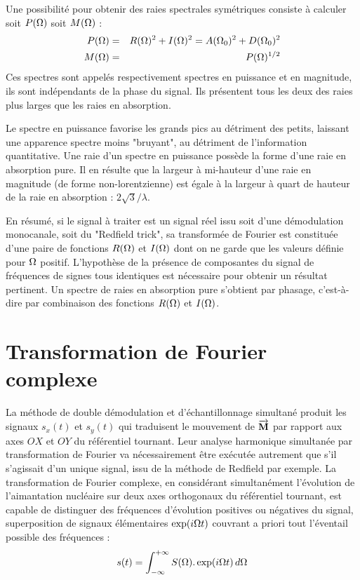 Une possibilité pour obtenir des raies spectrales symétriques 
consiste à calculer soit $P(\Omega)$ soit $M(\Omega)$ :
\begin{eqnarray}
P(\Omega) & = & R(\Omega)^2 + I(\Omega)^2 = A(\Omega_0)^2 + D(\Omega_0)^2 \\
M(\Omega) & = & P(\Omega)^{1/2} 
\end{eqnarray}
Ces spectres sont appelés respectivement spectres en puissance et en magnitude, ils sont 
indépendants de la phase du signal. 
Ils présentent tous les deux des raies plus larges que 
les raies en absorption.

Le spectre en puissance favorise les grands pics au détriment des 
petits, laissant une apparence spectre moins "bruyant", 
au détriment de l'information quantitative.
Une raie d'un spectre en puissance possède la forme d'une raie en absorption pure.
Il en résulte que la largeur à mi-hauteur d'une raie en magnitude (de forme non-lorentzienne)
est égale à la largeur à quart de hauteur de la raie en absorption : $2\sqrt{3}/\lambda$.

En résumé, si le signal à traiter est un signal réel issu soit d'une démodulation 
monocanale, soit du "Redfield trick", sa transformée de Fourier est constituée d'une 
paire de fonctions $R(\Omega)$ et $I(\Omega)$ 
dont on ne garde que les valeurs définie pour $\Omega$ positif. 
L'hypothèse de la présence de composantes du signal de fréquences de signes tous identiques 
est nécessaire pour obtenir un résultat pertinent. 
Un spectre de raies en absorption pure s'obtient par phasage, c'est-à-dire par
combinaison des fonctions $R(\Omega)$ et $I(\Omega)$.

\section{Transformation de Fourier complexe}

La méthode de double démodulation et d'échantillonnage simultané produit les signaux 
$s_x(t)$ et $s_y(t)$ qui traduisent le mouvement de $\overrightarrow{\mathbf{M}}$ par rapport aux axes $OX$ et $OY$ du 
référentiel tournant. 
Leur analyse harmonique simultanée par transformation de Fourier 
va nécessairement être exécutée autrement que s'il s'agissait d'un unique signal, issu de 
la méthode de Redfield par exemple.
La transformation de Fourier complexe, en considérant
simultanément l'évolution de l'aimantation nucléaire sur deux axes
orthogonaux du référentiel tournant, est capable de distinguer des 
fréquences d'évolution positives ou négatives du signal, superposition de
signaux élémentaires $\exp(i \Omega t)$ couvrant a priori tout l'éventail possible
des fréquences :
\begin{equation}
s(t) = \int_{-\infty}^{+\infty} S(\Omega).\exp(i \Omega t) \, d\Omega
\end{equation}


